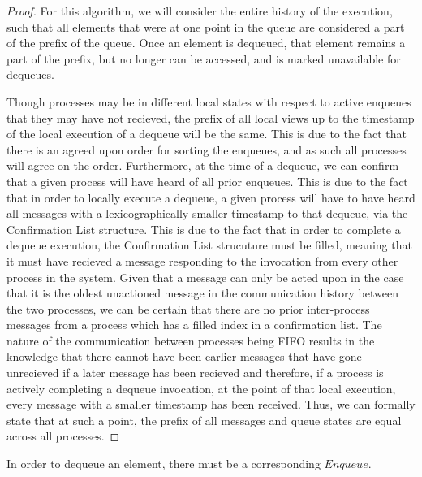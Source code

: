 \documentclass[a4paper,USenglish]{lipics-v2021} %
\begin{document}
\begin{proof}
  For this algorithm, we will consider the entire history of the execution, such that all elements that were at one point in the queue are considered a part of the prefix of the queue. Once an element is dequeued, that element remains a part of the prefix, but no longer can be accessed, and is marked unavailable for dequeues.
  
Though processes may be in different local states with respect to active enqueues that they may have not recieved, the prefix of all local views up to the timestamp of the local execution of a dequeue will be the same. This is due to the fact that there is an agreed upon order for sorting the enqueues, and as such all processes will agree on the order. Furthermore, at the time of a dequeue, we can confirm that a given process will have heard of all prior enqueues. This is due to the fact that in order to locally execute a dequeue, a given process will have to have heard all messages with a lexicographically smaller timestamp to that dequeue, via the Confirmation List structure. This is due to the fact that in order to complete a dequeue execution, the Confirmation List strucuture must be filled, meaning that it must have recieved a message responding to the invocation from every other process in the system. Given that a message can only be acted upon in the case that it is the oldest unactioned message in the communication history between the two processes, we can be certain that there are no prior inter-process messages from a process which has a filled index in a confirmation list. The nature of the communication between processes being FIFO results in the knowledge that there cannot have been earlier messages that have gone unrecieved if a later message has been recieved and therefore, if a process is actively completing a dequeue invocation, at the point of that local execution, every message with a smaller timestamp has been received. Thus, we can formally state that at such a point, the prefix of all messages and queue states are equal across all processes.
\end{proof}

\begin{lemma}
In order to dequeue an element, there must be a corresponding $Enqueue$.
\end{lemma}
\end{document}
